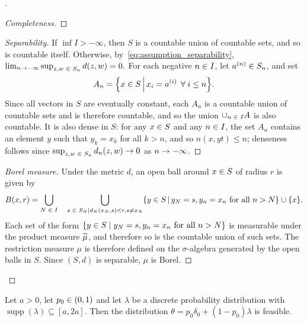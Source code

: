 \documentclass[10pt]{amsart}
\theoremstyle{definition}\newtheorem{defi}[theo]{Definition}\newtheorem{rema}[theo]{Remark}\newtheorem{exam}[theo]{Example}\newtheorem{exem}[theo]{Example}\newtheorem{nota}[theo]{Notation}
\DeclareMathOperator{\supp}{supp}
\newcommand*\all{\forall}
\newcommand*\union{\cup}
\let\originalleft\left
\let\originalright\right
\renewcommand{\left}{\mathopen{}\mathclose\bgroup\originalleft}
\renewcommand{\right}{\aftergroup\egroup\originalright}
\renewcommand*{\to}{\mathchoice{\longrightarrow}{\rightarrow}{\rightarrow}{\rightarrow}}
\let\oldin\in
\renewcommand{\in}{\mathchoice{\oldin}{\oldin}{\,\oldin\,}{\,\oldin\,}}
\let\oldtilde\tilde
\renewcommand*{\tilde}[1]{\mathchoice{\widetilde{#1}}{\widetilde{#1}}{\oldtilde{#1}}{\oldtilde{#1}}}
\let\oldforall\forall
\renewcommand*{\forall}{\mathrel{\oldforall}}
\newenvironment{proofc}[1][\proofname]{\begin{proof}[#1]}{\end{proof}}
\begin{document}
\begin{proofc}
\begin{proof}[{Completeness}]
\end{proof}
\begin{proof}[{Separability}] 
If $\inf I>-\infty$, then $S$ is a countable union of countable sets, and so is countable itself. Otherwise, by~\eqref{eq:assumption_separability}, $\lim_{n\to-\infty}\sup_{z,w\in S_{n}}d(z,w)=0.$ For each negative $n\in I$, let $a^{(n)}\in S_{n}$, and set
\[
A_{n}=\left\{ x\in S\,\middle|\, x_{i}=a^{\left(i\right)}\,\all i\leq n\right\}.
\]
Since all vectors in $S$ are eventually constant, each $A_{n}$ is a countable union of countable sets and is therefore countable, and so the union $\union_{n\in I}A$ is also countable. It is also dense in $S$: for any $x\in S$ and any $n\in I$, the set $A_{n}$ contains an element $y$ such that $y_{k}=x_{k}$ for all $k>n$, and so $n(x,yt)\leq n$; denseness follows since $\sup_{z,w\in S_{n}}d_{n}(z,w)\to0$ as $n\to-\infty$.\let\qed\relax
\end{proof}

\begin{proof}[{Borel measure}]
Under the metric $d$, an open ball around $x\in S$ of radius $r$ is given by
\[
B\left(x,r\right)=\bigcup_{N\in I}\quad\bigcup_{s\in S_{N}\mid d_{N}\left(x_{N},s\right)<r,s\neq x_{N}}\left\{ y\in S\,\middle|\, y_{N}=s,y_{n}=x_{n}\text{ for all }n>N\right\} \union\left\{ x\right\}.
\]
Each set of the form $\{ y\in S\mid y_{N}=s,y_{n}=x_{n}\text{ for all } n>N\} $ is measurable under the product measure $\tilde{\mu}$, and therefore so is the countable union of such sets. The restriction measure $\mu$ is therefore defined on the $\sigma$-algebra generated by the open balls in $S$. Since $(S,d)$ is separable, $\mu$ is Borel.
\end{proof}\let\qed\relax
\end{proofc}
\begin{prop}\label{prop:positive_interval_is_feasible}
Let $a>0$, let $p_{0}\in(0,1)$
and let $\lambda$ be a discrete probability distribution with $\supp(\lambda)\subseteq[a,2a].
$
Then the distribution $\theta=p_{0}\delta_{0}+(1-p_{0})\lambda$ is feasible.
\end{prop}
\end{document}
